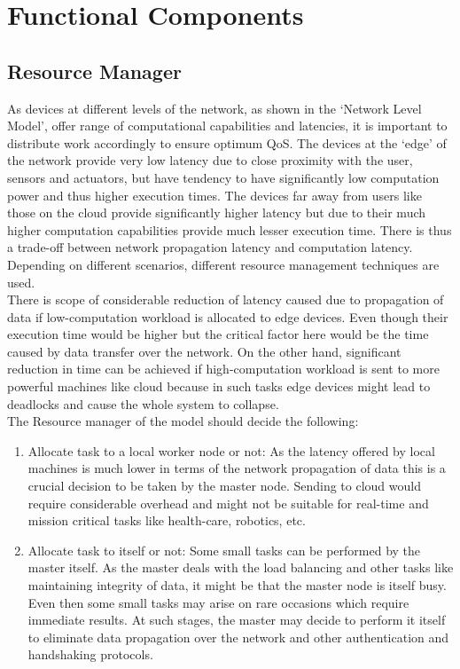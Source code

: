 \documentclass[AMA,STIX1COL]{WileyNJD-v2}
\begin{document}
\section{Functional Components}

\subsection{Resource Manager}
As devices at different levels of the network, as shown in the ‘Network Level Model’, offer range of computational capabilities and latencies, it is important to distribute work accordingly to ensure optimum QoS. The devices at the ‘edge’ of the network provide very low latency due to close proximity with the user, sensors and actuators, but have tendency to have significantly low computation power and thus higher execution times. The devices far away from users like those on the cloud provide significantly higher latency but due to their much higher computation capabilities provide much lesser execution time. There is thus a trade-off between network propagation latency and computation latency. Depending on different scenarios, different resource management techniques are used.\\
There is scope of considerable reduction of latency caused due to propagation of data if low-computation workload is allocated to edge devices. Even though their execution time would be higher but the critical factor here would be the time caused by data transfer over the network. On the other hand, significant reduction in time can be achieved if high-computation workload is sent to more powerful machines like cloud because in such tasks edge devices might lead to deadlocks and cause the whole system to collapse. \\
The Resource manager of the model should decide the following:
\begin{enumerate}
\item Allocate task to a local worker node or not: As the latency offered by local machines is much lower in terms of the network propagation of data this is a crucial decision to be taken by the master node. Sending to cloud would require considerable overhead and might not be suitable for real-time and mission critical tasks like health-care, robotics, etc. 
\item Allocate task to itself or not: Some small tasks can be performed by the master itself. As the master deals with the load balancing and other tasks like maintaining integrity of data, it might be that the master node is itself busy. Even then some small tasks may arise on rare occasions which require immediate results. At such stages, the master may decide to perform it itself to eliminate data propagation over the network and other authentication and handshaking protocols.
\end{enumerate}
\end{document}
